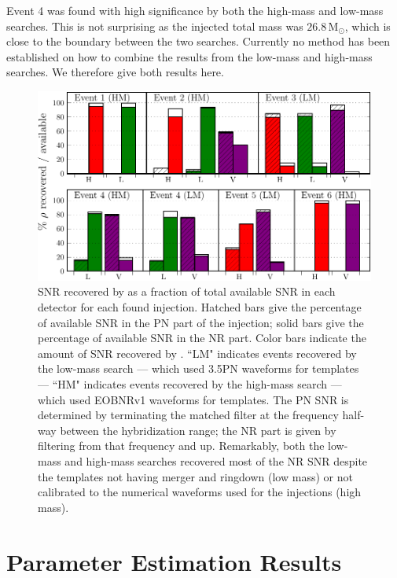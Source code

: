 Event 4 was found with high significance by both the high-mass and low-mass
searches. This is not surprising as the injected total mass was
$26.8\,\mathrm{M}_\odot$, which is close to the boundary between the two
searches. Currently no method has been established on how to combine the
results from the low-mass and high-mass searches. We therefore give both
results here.

\begin{figure}
  \centerline{\includegraphics[width=\columnwidth]{papers/mdc2013_submission/figure5}}
  \caption[SNR distribution]{\label{fig:snrDistribution}
SNR recovered by \ihope{} as a fraction of total available SNR in each detector
for each found injection. Hatched bars give the percentage of available SNR in
the PN part of the injection; solid bars give the percentage of available SNR
in the NR part. Color bars indicate the amount of SNR recovered by \ihope{}.
``LM" indicates events recovered by the low-mass search --- which used 3.5PN
waveforms for templates --- ``HM" indicates events recovered by the high-mass
search --- which used EOBNRv1 waveforms for templates. The PN SNR is determined
by terminating the matched filter at the frequency half-way between the
hybridization range; the NR part is given by filtering from that frequency and
up.  Remarkably, both the low-mass and high-mass searches recovered most of the
NR SNR despite the templates not having merger and ringdown (low mass) or not
calibrated to the numerical waveforms used for the injections (high mass).
  }
\end{figure}

\section{Parameter Estimation Results}
\label{sec:param_estimation}

